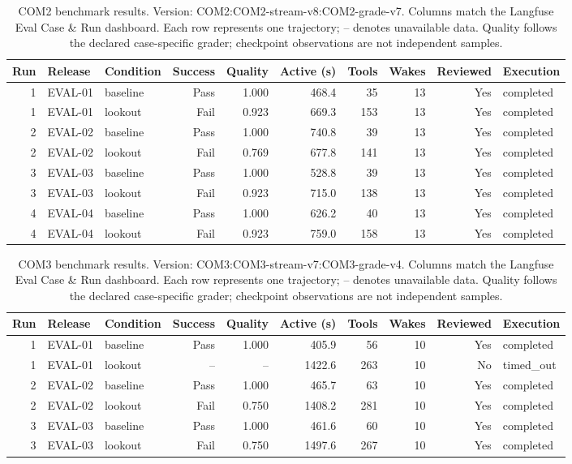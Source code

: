 \begin{table}[t]
\centering\scriptsize
\begin{tabular}{@{}rllrrrrrrl@{}}
\toprule
Run & Release & Condition & Success & Quality & Active (s) & Tools & Wakes & Reviewed & Execution \\
\midrule
1 & EVAL-01 & baseline & Pass & 1.000 & 468.4 & 35 & 13 & Yes & completed \\
1 & EVAL-01 & lookout & Fail & 0.923 & 669.3 & 153 & 13 & Yes & completed \\
2 & EVAL-02 & baseline & Pass & 1.000 & 740.8 & 39 & 13 & Yes & completed \\
2 & EVAL-02 & lookout & Fail & 0.769 & 677.8 & 141 & 13 & Yes & completed \\
3 & EVAL-03 & baseline & Pass & 1.000 & 528.8 & 39 & 13 & Yes & completed \\
3 & EVAL-03 & lookout & Fail & 0.923 & 715.0 & 138 & 13 & Yes & completed \\
4 & EVAL-04 & baseline & Pass & 1.000 & 626.2 & 40 & 13 & Yes & completed \\
4 & EVAL-04 & lookout & Fail & 0.923 & 759.0 & 158 & 13 & Yes & completed \\
\bottomrule
\end{tabular}
\caption{COM2 benchmark results. Version: COM2:COM2-stream-v8:COM2-grade-v7. Columns match the Langfuse Eval Case \& Run dashboard. Each row represents one trajectory; -- denotes unavailable data. Quality follows the declared case-specific grader; checkpoint observations are not independent samples.}
\label{tab:com-results-2}
\end{table}

\begin{table}[t]
\centering\scriptsize
\begin{tabular}{@{}rllrrrrrrl@{}}
\toprule
Run & Release & Condition & Success & Quality & Active (s) & Tools & Wakes & Reviewed & Execution \\
\midrule
1 & EVAL-01 & baseline & Pass & 1.000 & 405.9 & 56 & 10 & Yes & completed \\
1 & EVAL-01 & lookout & -- & -- & 1422.6 & 263 & 10 & No & timed\_out \\
2 & EVAL-02 & baseline & Pass & 1.000 & 465.7 & 63 & 10 & Yes & completed \\
2 & EVAL-02 & lookout & Fail & 0.750 & 1408.2 & 281 & 10 & Yes & completed \\
3 & EVAL-03 & baseline & Pass & 1.000 & 461.6 & 60 & 10 & Yes & completed \\
3 & EVAL-03 & lookout & Fail & 0.750 & 1497.6 & 267 & 10 & Yes & completed \\
\bottomrule
\end{tabular}
\caption{COM3 benchmark results. Version: COM3:COM3-stream-v7:COM3-grade-v4. Columns match the Langfuse Eval Case \& Run dashboard. Each row represents one trajectory; -- denotes unavailable data. Quality follows the declared case-specific grader; checkpoint observations are not independent samples.}
\label{tab:com-results-3}
\end{table}


